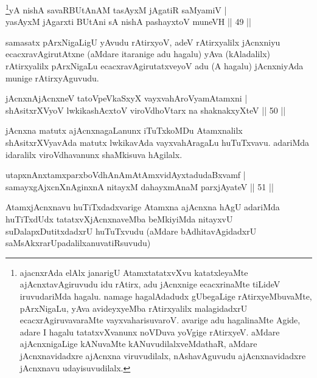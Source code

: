 \begin{shl}
\footnote{ajacnxrAda elAlx janarigU AtamxtatatxvXvu katatxleyaMte ajAcnxtavAgiruvudu idu rAtirx, adu jAcnxnige ecacxrinaMte tiLideV iruvudariMda hagalu. namage hagalAdadudx gUbegaLige rAtirxyeMbuvaMte, pArxNigaLu, yAva avideyxyeMba rAtirxyalilx malagidadxrU ecacxrAgi\-ruvavaraMte vayxvaharisuvaroV. avarige adu hagalinaMte Agide, adare I hagalu tatatxvXvanunx noVDuva yoVgige rAtirxyeV. aMdare ajAcnxnigaLige kANuvaMte kANuvudilalx\-veMdathaR, aMdare jAcnxnavidadxre ajAcnxna viruvudilalx, nAshavAguvudu ajAcnxnavidadxre jAcnxnavu udayisuvudilalx.}yA nishA savaRBUtAnAM tasAyxM jAgatiR saMyamiV |\\
yasAyxM jAgarxti BUtAni sA nishA pashayxtoV muneVH \hfill || 49 ||
\end{shl}

\begin{artha}
samasatx pArxNigaLigU yAvudu rAtirxyoV, adeV rAtirxyalilx jAcnxniyu ecacxravAgirutAtxne (aMdare itaranige adu hagalu) yAva (kAladalilx) rAtirxyalilx pArxNigaLu ecacxravAgirutatxveyoV adu (A hagalu) jAcnxniyAda munige rAtirxyAguvudu.
\end{artha}

\begin{shl}
jAcnxnAjAcnxneV tatoV\s peVkaSxyX vayxvahAroV\s yamAtamxni |\\
shAsitxrXVyoV lwkikashAcxtoV viroVdhoV\s tarx na shaknakxyXteV \hfill || 50 ||
\end{shl}

\begin{artha}%
jAcnxna matutx ajAcnxnagaLanunx iTuTxkoMDu Atamxnalilx shAsitxrXVyavAda matutx lwkikavAda vayxvahAragaLu huTuTxvavu. adariMda idaralilx viroVdhavanunx shaMkisuva hAgilalx.
\end{artha}


\begin{shl}
utapxnAnxtamxparxboVdhAnAmAtAmxvidAyxtadudaBxvamf |\\
samayxgAjxcnXnAginxnA nitayxM dahayxmAnaM parxjAyateV \hfill || 51 ||
\end{shl}

\begin{artha}
AtamxjAcnxnavu huTiTxdadxvarige Atamxna ajAcnxna hAgU adariMda huTiTxdUdx tatatxvXjAcnxnaveMba beMkiyiMda nitayxvU suDalapxDutitxdadxrU huTuTxvudu (aMdare bAdhitavAgidadxrU saMsAkxrarUpadalilx\break anuvatiRsuvudu) 
\end{artha}

